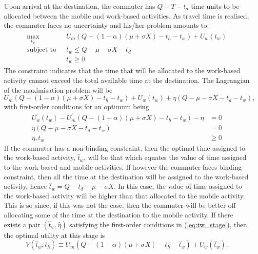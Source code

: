 \documentclass[12pt,a4paper,british]{article}
\begin{document}
Upon arrival at the destination, the commuter has $Q-T-t_{d}$ time units to be allocated between the mobile and work-based activities.
As travel time is realised, the commuter faces no uncertainty and his/her problem amounts to:
\begin{align}
\begin{split}
\max_{t_{w}} \quad & U_{m}\left(Q - \left(1 - \alpha\right) \left(\mu + \sigma X\right) - t_{h} - t_{w}\right) + U_{w}\left(t_{w}\right) \\
\mbox{subject to } \,\, & t_{w} \leq Q-\mu-\sigma X-t_{d} \\
 & t_w \geq 0 
\end{split}
\label{eq:secondStageProb}
\end{align}
The constraint indicates that the time that will be allocated to the work-based activity cannot exceed the total available time at the
destination. The Lagrangian of the maximisation problem will be%
\begin{equation*}
U_{m}\left(Q-\left(1-\alpha\right)\left(\mu+\sigma X\right)-t_{h}-t_{w}\right)+U_{w}\left(t_{w}\right)+\eta\left(Q-\mu-\sigma X-t_{d}-t_{w}\right),
\end{equation*}
with first-order conditions for an optimum being%
\begin{subequations}
\label{eq:tw_stage}
\begin{align}
U_{w}^{\prime}\left(t_{w}\right)-U_{m}^{\prime}\left(Q-\left(1-\alpha\right)\left(\mu+\sigma X\right)-t_{h}-t_{w}\right)-\eta & =0
\label{eq:stage2_wrt_tw}\\
\eta\left(Q-\mu-\sigma X-t_{d}-t_{w}\right) & =0\label{eq:stage2_compl}\\
\eta,t_{w} & \geq 0
\label{eq:stage2_nonnegative}
\end{align}
\end{subequations}
If the commuter has a non-binding constraint, then the optimal time assigned to the work-based activity, $\hat{t}_{w}$, will be that which equates the value of time assigned to the work-based and mobile activities. If however the commuter faces binding constraint, then all the time at the destination will be assigned to the work-based activity, hence $\hat{t}_{w}=Q-t_{d}-\mu-\sigma X$. In this case, the value of time assigned to the work-based activity will be higher than that allocated to the mobile activity. This is so since, if this was not the case, then the commuter will be better off allocating some of the time at the destination to the mobile activity. If there exists a pair $\left(\hat{t}_{w},\hat{\eta}\right)$ satisfying the first-order conditions in (\ref{eq:tw_stage}), then the optimal utility at this stage is\begin{equation*}
V\left(\hat{t}_{w};t_{h}\right)\equiv U_{m}\left(Q-\left(1-\alpha\right)\left(\mu+\sigma X\right)-t_{h}-\hat{t}_{w}\right)+U_{w}\left(\hat{t}_{w}\right).
\end{equation*}
\end{document}
